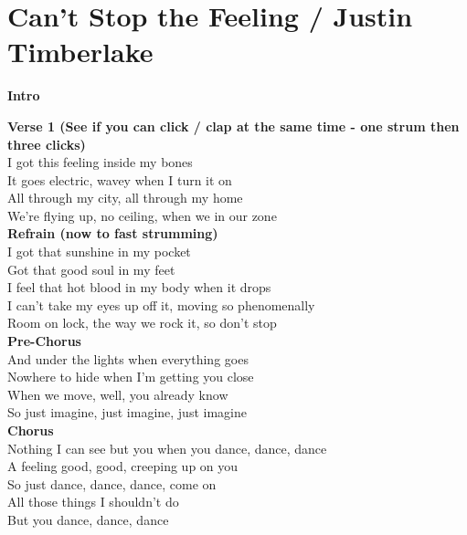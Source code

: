 \section{Can't Stop the Feeling / Justin Timberlake}\label{sec:cantstopthefeeling}

\Aminor
\AflatMajor
\BflatMajor
\Cmajor
\Fmajor
\FminorSeven

\textbf{Intro}       

\textbf{Verse 1 (See if you can click / clap at the same time - one strum then three clicks)}\\
I got this feeling inside my bones\\
It goes electric, wavey when I turn it on\\
All through my city, all through my home\\
We're flying up, no ceiling, when we in our zone\\
\textbf{Refrain (now to fast strumming)}\\
I got that sunshine in my pocket\\
Got that good soul in my feet\\
I feel that hot blood in my body when it drops\\
I can't take my eyes up off it, moving so phenomenally\\
Room on lock, the way we rock it, so don't stop\\
\textbf{Pre-Chorus}\\
And under the lights when everything goes\\
Nowhere to hide when I'm getting you close\\
When we move, well, you already know\\
So just imagine, just imagine, just imagine\\
\textbf{Chorus}\\
Nothing I can see but you when you dance, dance, dance\\
A feeling good, good, creeping up on you\\
So just dance, dance, dance, come on\\
All those things I shouldn't do\\
But you dance, dance, dance\\
